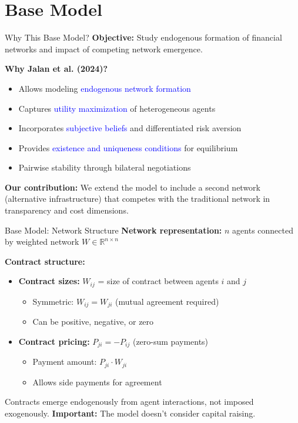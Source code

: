 \documentclass[aspectratio=169]{beamer}
\begin{document}
\section{Base Model}

\begin{frame}{Why This Base Model?}
\textbf{Objective:} Study endogenous formation of financial networks and impact of competing network emergence.

\vspace{0.5cm}
\textbf{Why Jalan et al. (2024)?}
\begin{itemize}
    \item Allows modeling \textcolor{blue}{endogenous network formation}
    \item Captures \textcolor{blue}{utility maximization} of heterogeneous agents
    \item Incorporates \textcolor{blue}{subjective beliefs} and differentiated risk aversion
    \item Provides \textcolor{blue}{existence and uniqueness conditions} for equilibrium
    \item Pairwise stability through bilateral negotiations
\end{itemize}

\vspace{0.3cm}
\textbf{Our contribution:} We extend the model to include a second network (alternative infrastructure) that competes with the traditional network in transparency and cost dimensions.
\end{frame}

\begin{frame}{Base Model: Network Structure}
\textbf{Network representation:} $n$ agents connected by weighted network $W\in\mathbb{R}^{n\times n}$

\vspace{0.3cm}
\textbf{Contract structure:}
\begin{itemize}
    \item \textbf{Contract sizes:} $W_{ij}$ = size of contract between agents $i$ and $j$
    \begin{itemize}
        \item Symmetric: $W_{ij} = W_{ji}$ (mutual agreement required)
        \item Can be positive, negative, or zero
    \end{itemize}
    
    \item \textbf{Contract pricing:} $P_{ji} = -P_{ij}$ (zero-sum payments)
    \begin{itemize}
        \item Payment amount: $P_{ji} \cdot W_{ji}$
        \item Allows side payments for agreement
    \end{itemize}
\end{itemize}

\vspace{0.3cm}
Contracts emerge endogenously from agent interactions, not imposed exogenously.
\vspace{0.2cm}
\textbf{Important:} The model doesn't consider capital raising.
\end{frame}
\end{document}
